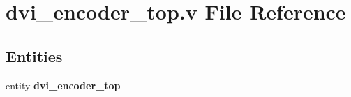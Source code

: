 \section{dvi\-\_\-encoder\-\_\-top.\-v File Reference}
\label{dvi__encoder__top_8v}
\subsection*{Entities}
\begin{DoxyCompactItemize}
\item 
entity {\bf dvi\-\_\-encoder\-\_\-top}
\end{DoxyCompactItemize}
